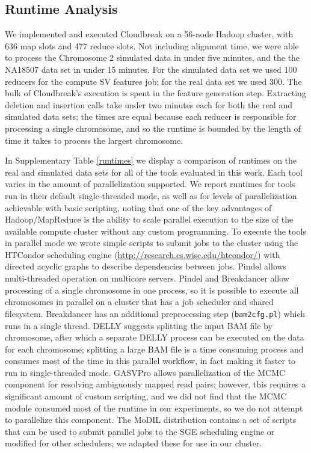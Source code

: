 \documentclass[11pt]{article}
\begin{document}
\subsection{Runtime Analysis}

We implemented and executed Cloudbreak on a 56-node Hadoop cluster, with 636 map slots and 477 reduce slots. Not including alignment time, we were able to process the Chromosome 2 simulated data in under five minutes, and the the NA18507 data set in under 15 minutes. For the simulated data set we used 100 reducers for the compute SV features job; for the real data set we used 300. The bulk of Cloudbreak's execution is spent in the feature generation step. Extracting deletion and insertion calls take under two minutes each for both the real and simulated data sets; the times are equal because each reducer is responsible for processing a single chromosome, and so the runtime is bounded by the length of time it takes to process the largest chromosome. 

In Supplementary Table \ref{runtimes} we display a comparison of runtimes on the real and simulated data sets for all of the tools evaluated in this work. Each tool varies in the amount of parallelization supported. We report runtimes for tools run in their default single-threaded mode, as well as for levels of parallelization achievable with basic scripting, noting that one of the key advantages of Hadoop/MapReduce is the ability to scale parallel execution to the size of the available compute cluster without any custom programming. To execute the tools in parallel mode we wrote simple scripts to submit jobs to the cluster using the HTCondor scheduling engine (\url{http://research.cs.wisc.edu/htcondor/}) with directed acyclic graphs to describe dependencies between jobs.  Pindel allows multi-threaded operation on multicore servers. Pindel and Breakdancer allow processing of a single chromosome in one process, so it is possible to execute all chromosomes in parallel on a cluster that has a job scheduler and shared filesystem. Breakdancer has an additional preprocessing step (\texttt{bam2cfg.pl}) which runs in a single thread. DELLY suggests splitting the input BAM file by chromosome, after which a separate DELLY process can be executed on the data for each chromosome; splitting a large BAM file is a time consuming process and consumes most of the time in this parallel workflow, in fact making it faster to run in single-threaded mode. GASVPro allows parallelization of the MCMC component for resolving ambiguously mapped read pairs; however, this requires a significant amount of custom scripting, and we did not find that the MCMC module consumed most of the runtime in our experiments, so we do not attempt to parallelize this component. The MoDIL distribution contains a set of scripts that can be used to submit parallel jobs to the SGE scheduling engine or modified for other schedulers; we adapted these for use in our cluster.
\end{document}
